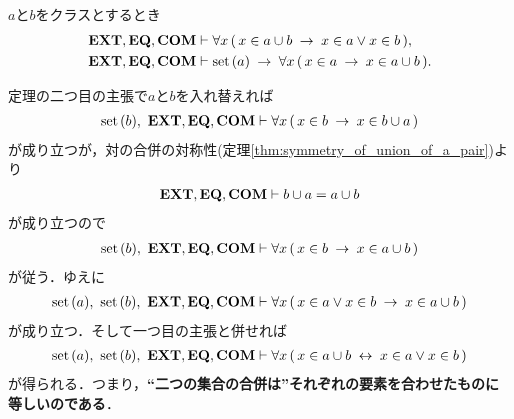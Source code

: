 	\begin{screen}
		\begin{thm}[二つの集合の合併はそれぞれの要素を合わせたもの]
		\label{thm:union_of_pair_is_union_of_their_elements}
			$a$と$b$をクラスとするとき
			\begin{align}
				\EXTAX,\EQAX,\COMAX &\vdash 
				\forall x\, (\, x \in a \cup b \rarrow x \in a \vee x \in b\, ), \\
				\EXTAX,\EQAX,\COMAX &\vdash 
				\set{a} \rarrow \forall x\, (\, x \in a \rarrow x \in a \cup b\, ).
			\end{align}
		\end{thm}
	\end{screen}
	
	定理の二つ目の主張で$a$と$b$を入れ替えれば
	\begin{align}
		\set{b},\ \EXTAX,\EQAX,\COMAX \vdash \forall x\, (\, x \in b \rarrow x \in b \cup a\, )
	\end{align}
	が成り立つが，対の合併の対称性(定理\ref{thm:symmetry_of_union_of_a_pair})より
	\begin{align}
		\EXTAX,\EQAX,\COMAX \vdash b \cup a = a \cup b
	\end{align}
	が成り立つので
	\begin{align}
		\set{b},\ \EXTAX,\EQAX,\COMAX \vdash \forall x\, (\, x \in b \rarrow x \in a \cup b\, )
	\end{align}
	が従う．ゆえに
	\begin{align}
		\set{a},\ \set{b},\ \EXTAX,\EQAX,\COMAX \vdash 
		\forall x\, (\, x \in a \vee x \in b \rarrow x \in a \cup b\, )
	\end{align}
	が成り立つ．そして一つ目の主張と併せれば
	\begin{align}
		\set{a},\ \set{b},\ \EXTAX,\EQAX,\COMAX \vdash 
		\forall x\, (\, x \in a \cup b \lrarrow x \in a \vee x \in b\, )
	\end{align}
	が得られる．つまり，{\bf ``二つの集合の合併は''それぞれの要素を合わせたものに等しいのである}．
	
